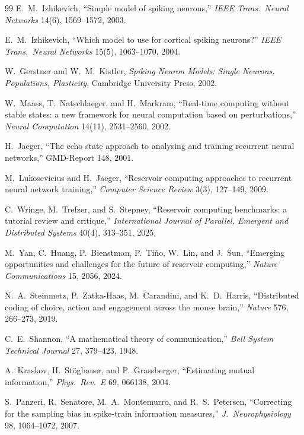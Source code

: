 \documentclass[10pt,a4paper]{article}
\begin{document}
\begin{thebibliography}{99}
E.~M.~Izhikevich, ``Simple model of spiking neurons,''
\emph{IEEE Trans.\ Neural Networks} 14(6), 1569--1572, 2003.

E.~M.~Izhikevich, ``Which model to use for cortical spiking
neurons?'' \emph{IEEE Trans.\ Neural Networks} 15(5), 1063--1070,
2004.

W.~Gerstner and W.~M.~Kistler, \emph{Spiking Neuron Models: Single
Neurons, Populations, Plasticity}, Cambridge University Press, 2002.

W.~Maass, T.~Natschlaeger, and H.~Markram, ``Real-time computing
without stable states: a new framework for neural computation based
on perturbations,'' \emph{Neural Computation} 14(11), 2531--2560,
2002.

H.~Jaeger, ``The echo state approach to analysing and training
recurrent neural networks,'' GMD-Report 148, 2001.

M.~Lukosevicius and H.~Jaeger, ``Reservoir computing approaches to
recurrent neural network training,'' \emph{Computer Science Review}
3(3), 127--149, 2009.

C.~Wringe, M.~Trefzer, and S.~Stepney, ``Reservoir computing
benchmarks: a tutorial review and critique,'' \emph{International
Journal of Parallel, Emergent and Distributed Systems} 40(4),
313--351, 2025.

M.~Yan, C.~Huang, P.~Bienstman, P.~Ti{\v n}o, W.~Lin, and J.~Sun,
``Emerging opportunities and challenges for the future of reservoir
computing,'' \emph{Nature Communications} 15, 2056, 2024.

N.~A.~Steinmetz, P.~Zatka-Haas, M.~Carandini, and K.~D.~Harris,
``Distributed coding of choice, action and engagement across the mouse
brain,'' \emph{Nature} 576, 266--273, 2019.

C.~E.~Shannon, ``A mathematical theory of communication,''
\emph{Bell System Technical Journal} 27, 379--423, 1948.

A.~Kraskov, H.~St{\"o}gbauer, and P.~Grassberger, ``Estimating
mutual information,'' \emph{Phys.\ Rev.\ E} 69, 066138, 2004.

S.~Panzeri, R.~Senatore, M.~A.~Montemurro, and R.~S.~Petersen,
``Correcting for the sampling bias in spike-train information
measures,'' \emph{J.\ Neurophysiology} 98, 1064--1072, 2007.


\end{thebibliography}
\end{document}
